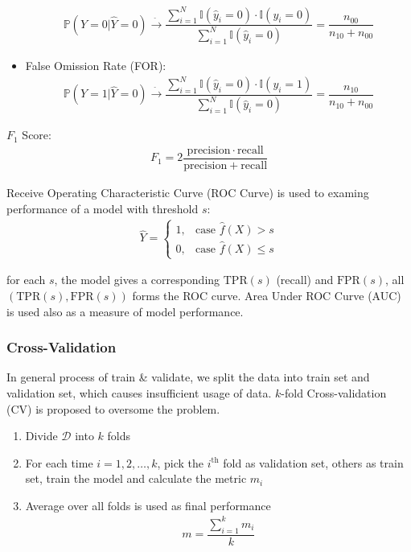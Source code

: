 \begin{itemize}[topsep=2pt,itemsep=0pt]
    \begin{align}
        \mathbb{P}\left( Y=0|\hat{Y}=0 \right)\xrightarrow[]{\hat{ }}\dfrac{\sum_{i=1}^N\mathbb{I}(\hat{y}_i=0)\cdot\mathbb{I}(y_i=0)}{\sum_{i=1}^N\mathbb{I}(\hat{y}_i=0)} =\dfrac{n_{00}}{n_{10}+n_{00}} 
    \end{align}
    \item False Omission Rate (FOR):
    \begin{align}
        \mathbb{P}\left( Y=1|\hat{Y}=0 \right)\xrightarrow[]{\hat{ }}\dfrac{\sum_{i=1}^N\mathbb{I}(\hat{y}_i=0)\cdot\mathbb{I}(y_i=1)}{\sum_{i=1}^N\mathbb{I}(\hat{y}_i=0)} =\dfrac{n_{10}}{n_{10}+n_{00}} 
    \end{align}
\end{itemize}

    $ F_1 $ Score:
    \begin{align}
        F_1=2\dfrac{\mathrm{precision}\cdot\mathrm{recall}  }{\mathrm{precision}+\mathrm{recall}  } 
    \end{align}
    
    Receive Operating Characteristic Curve (ROC Curve) is used to examing performance of a model with threshold $ s $:
    \begin{align}
        \hat{Y}=\begin{cases}
            1,&\text{case }\hat{f}(X)>s\\
            0,&\text{case }\hat{f}(X)\leq s
        \end{cases}
    \end{align}

    for each $ s $, the model gives a corresponding $ \mathrm{TPR}(s)  $ (recall) and $ \mathrm{FPR}(s)  $, all $ (\mathrm{TPR}(s),\mathrm{FPR}(s)  ) $ forms the ROC curve. Area Under ROC Curve (AUC) is used also as a measure of model performance.

\subsubsection{Cross-Validation}
    In general process of train \& validate, we split the data into train set and validation set, which causes insufficient usage of data. $ k $-fold Cross-validation (CV) is proposed to oversome the problem.

    \begin{enumerate}[topsep=2pt,itemsep=2pt]
        \item Divide $ \mathcal{D} $ into $ k $ folds
        \item For each time $ i=1,2,\ldots,k $, pick the $ i^\mathrm{th}  $ fold as validation set, others as train set, train the model and calculate the metric $ m_i $
        \item Average over all folds is used as final performance
        \begin{align}
            m=\dfrac{\sum_{i=1}^km_i}{k} 
        \end{align}
    \end{enumerate}

